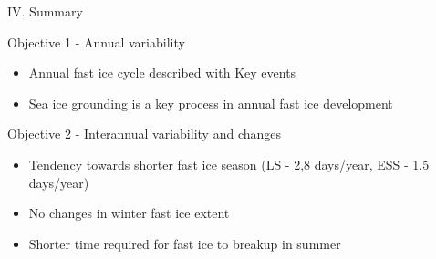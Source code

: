 \documentclass[8pt]{beamer}
\begin{document}
\setwatermark{\fontsize{125pt}{125pt}\selectfont{}}
\begin{frame}{IV. Summary}
	\begin{block}{Objective 1 -  Annual variability}
		\begin{itemize}
			\item Annual fast ice cycle described with Key events
			\item Sea ice grounding is a key process in annual fast ice development
		\end{itemize}
	\end{block}
	\begin{block}{Objective 2 - Interannual variability and changes}
		\begin{itemize}
			\item Tendency towards shorter fast ice season (LS - 2,8 days/year, ESS - 1.5 days/year)
			\item No changes in winter fast ice extent
			\item Shorter time required for fast ice to breakup in summer 
		\end{itemize}
	\end{block}
\end{frame}

\end{document}
